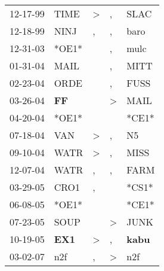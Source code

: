 \begin{supertabular}{p{0.07\textwidth}p{0.06\textwidth}p{0.02\textwidth}p{0.02\textwidth}p{0.06\textwidth}}
 12-17-99\textsuperscript{} &          TIME\textsuperscript{} &  \textgreater &             , &           SLAC\textsuperscript{} \\
 12-18-99\textsuperscript{} &          NINJ\textsuperscript{} &             , &             , &           baro\textsuperscript{} \\
 12-31-03\textsuperscript{} &                           *OE1* &               &             , &           mulc\textsuperscript{} \\
 01-31-04\textsuperscript{} &          MAIL\textsuperscript{} &               &             , &           MITT\textsuperscript{} \\
 02-23-04\textsuperscript{} &          ORDE\textsuperscript{} &               &             , &           FUSS\textsuperscript{} \\
 03-26-04\textsuperscript{} &   \textbf{FF\textsuperscript{}} &               &  \textgreater &           MAIL\textsuperscript{} \\
 04-20-04\textsuperscript{} &                           *OE1* &               &               &                            *CE1* \\
 07-18-04\textsuperscript{} &           VAN\textsuperscript{} &  \textgreater &             , &             N5\textsuperscript{} \\
 09-10-04\textsuperscript{} &          WATR\textsuperscript{} &  \textgreater &             , &           MISS\textsuperscript{} \\
 12-07-04\textsuperscript{} &          WATR\textsuperscript{} &             , &             , &           FARM\textsuperscript{} \\
 03-29-05\textsuperscript{} &          CRO1\textsuperscript{} &             , &               &                            *CS1* \\
 06-08-05\textsuperscript{} &                           *OE1* &               &               &                            *CE1* \\
 07-23-05\textsuperscript{} &          SOUP\textsuperscript{} &               &  \textgreater &           JUNK\textsuperscript{} \\
 10-19-05\textsuperscript{} &  \textbf{EX1\textsuperscript{}} &  \textgreater &             , &  \textbf{kabu\textsuperscript{}} \\
 03-02-07\textsuperscript{} &           n2f\textsuperscript{} &             , &  \textgreater &            n2f\textsuperscript{} \\

\end{supertabular}
